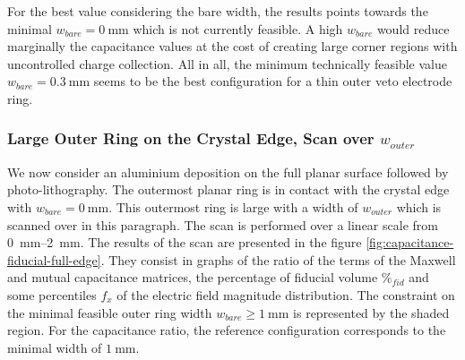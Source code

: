 For the best value considering the bare width, the results points towards the minimal $w_{bare} = \SI{0}{\mm}$ which is not currently feasible. A high $w_{bare}$ would reduce marginally the capacitance values at the cost of creating large corner regions with uncontrolled charge collection. All in all, the minimum technically feasible value $w_{bare}=\SI{0.3}{\mm}$ seems to be the best configuration for a thin outer veto electrode ring.


\subsubsection{Large Outer Ring on the Crystal Edge, Scan over $w_{outer}$}

We now consider an aluminium deposition on the full planar surface followed by photo-lithography. The outermost planar ring is in contact with the crystal edge with $w_{bare}=\SI{0}{\mm}$. This outermost ring is large with a width of $w_{outer}$ which is scanned over in this paragraph. The scan is performed over a linear scale from \SIrange{0}{2}{\mm}. The results of the scan are presented in the figure \ref{fig:capacitance-fiducial-full-edge}. They consist in graphs of the ratio of the terms of the Maxwell and mutual capacitance matrices, the percentage of fiducial volume $\%_{fid}$ and some percentiles $f_x$ of the electric field magnitude distribution. The constraint on the minimal feasible outer ring width $w_{bare} \geq \SI{1}{\mm}$ is represented by the shaded region. For the capacitance ratio, the reference configuration corresponds to the minimal width of $\SI{1}{\mm}$.

